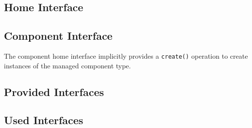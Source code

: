 \subsection{Home Interface}



\subsection{Component Interface}


The component home interface implicitly provides a {\tt create()} operation
to create instances of the managed component type.







\subsection{Provided Interfaces}


\subsection{Used Interfaces}




\newpage
